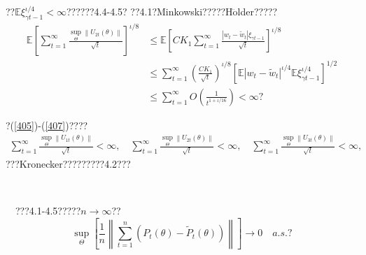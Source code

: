 \documentclass[a4paper,12pt,openany,oneside,utf-8]{ctexbook}
\newcommand{\xiaosihao}{\fontsize{12pt}{\baselineskip}\selectfont}
\begin{document}
	\noindent ??$\mathbb{E} \xi_{\gamma t-1}^{\iota / 4}<\infty$??????4.4-4.5? ??4.1?Minkowski?????H$\ddot{\mathrm{o}}$lder?????
	\begin{align}\label{407}
		\mathbb{E}\left[\sum_{t=1}^{\infty} \frac{\sup _{\Theta}\left\|U_{2 t}(\theta)\right\|}{\sqrt{t}}\right]^{\iota / 8}&\leq \mathbb{E}\left[C K_{1} \sum_{t=1}^{\infty} \frac{\left|w_{t}-\tilde{w}_{t}\right| \xi_{\gamma t-1}}{\sqrt{t}}\right]^{\iota / 8}\nonumber\\
		&\leq \sum_{t=1}^{\infty}\left(\frac{C K_{1}}{\sqrt{t}}\right)^{\iota / 8}\left[\mathbb{E}\left|w_{t}-\tilde{w}_{t}\right|^{\iota / 4} \mathbb{E} \xi_{\gamma t-1}^{\iota / 4}\right]^{1 / 2}\nonumber\\
		&\leq \sum_{t=1}^{\infty} O\left(\frac{1}{t^{1+\iota / 16}}\right)<\infty\mbox{?}
	\end{align}
	
	\noindent ?(\ref{405})-(\ref{407})????
	\begin{align}
		\sum_{t=1}^{\infty} \frac{\sup _{\Theta}\left\|U_{1 t}(\theta)\right\|}{\sqrt{t}}<\infty,\quad \sum_{t=1}^{\infty} \frac{\sup_{\Theta}\left\|U_{2t}(\theta)\right\|}{\sqrt{t}}<\infty,\quad \sum_{t=1}^{\infty} \frac{\sup_{\Theta}\left\|U_{3t}(\theta)\right\|}{\sqrt{t}}<\infty,\nonumber
	\end{align}
	???Kronecker?????????4.2???
	
	\
	
	\noindent{\xiaosihao\heiti ??~4.3}~~???4.1-4.5?????$n\rightarrow \infty$??
	$$
	\sup _{\Theta}\left[\frac{1}{n}\left\|\sum_{t=1}^n\left(P_t(\theta)-\tilde{P}_t(\theta)\right)\right\|\right] \rightarrow 0 \quad a.s.\mbox{?}
	$$
	
\end{document}
